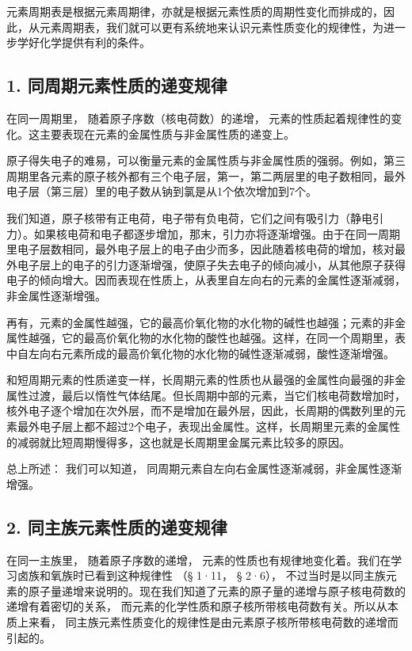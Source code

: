 元素周期表是根据元素周期律，亦就是根据元素性质的周期性变化而排成的，因此，从元素周期表，我们就可以更有系统地来认识元素性质变化的规律性，为进一步学好化学提供有利的条件。

\subsection{1. 同周期元素性质的递变规律}

在同一周期里， 随着原子序数（核电荷数）的递增，
元素的性质起着规律性的变化。这主要表现在元素的金属性质与非金属性质的递变上。

原子得失电子的难易，可以衡量元素的金属性质与非金属性质的强弱。例如，第三周期里各元素的原子核外都有三个电子层，第一，第二两层里的电子数相同，最外电子层（第三层）里的电子数从钠到氯是从1个依次增加到7个。

我们知道，原子核带有正电荷，电子带有负电荷，它们之间有吸引力（静电引力）。如果核电荷和电子都逐步增加，那末，引力亦将逐渐增强。由于在同一周期里电子层数相同，最外电子层上的电子由少而多，因此随着核电荷的增加，核对最外电子层上的电子的引力逐渐增强，使原子失去电子的倾向减小，从其他原子获得电子的倾向增大。因而表现在性质上，从表里自左向右的元素的金属性逐渐减弱，非金属性逐渐增强。

再有，元素的金属性越强，它的最高价氧化物的水化物的碱性也越强；元素的非金属性越强，它的最高价氧化物的水化物的酸性也越强。这样，在同一个周期里，表中自左向右元素所成的最高价氧化物的水化物的碱性逐渐减弱，酸性逐渐增强。

和短周期元素的性质递变一样，长周期元素的性质也从最强的金属性向最强的非金属性过渡，最后以惰性气体结尾。但长周期中部的元素，当它们核电荷数增加时，核外电子逐个增加在次外层，而不是增加在最外层，因此，长周期的偶数列里的元素最外电子层上都不超过2个电子，表现出金属性。这样，长周期里元素的金属性的减弱就比短周期慢得多，这也就是长周期里金属元素比较多的原因。

总上所述： 我们可以知道，
同周期元素自左向右金属性逐渐减弱，非金属性逐渐增强。

\subsection{2. 同主族元素性质的递变规律}

在同一主族里， 随着原子序数的递增，
元素的性质也有规律地变化着。我们在学习卤族和氧族时已看到这种规律性 （§
1·11， § 2·6），
不过当时是以同主族元素的原子量递增来说明的。现在我们知道了元素的原子量的递增与原子核电荷数的递增有着密切的关系，
而元素的化学性质和原子核所带核电荷数有关。所以从本质上来看，
同主族元素性质变化的规律性是由元素原子核所带核电荷数的递增而引起的。

